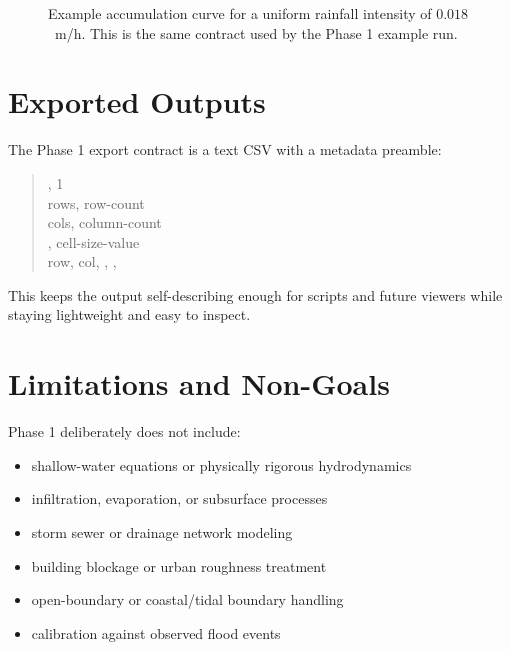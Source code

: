\documentclass[10pt]{article}
\begin{document}
\begin{figure}[h]
\centering
{}
\caption{Example accumulation curve for a uniform rainfall intensity of $0.018$~m/h. This is the same contract used by the Phase 1 example run.}
\end{figure}

\section{Exported Outputs}

The Phase 1 export contract is a text CSV with a metadata preamble:

\begin{quote}
\small
{}, 1 \\
rows, row-count \\
cols, column-count \\
{}, cell-size-value \\
row, col, {}, {}, {}
\end{quote}

This keeps the output self-describing enough for scripts and future viewers while staying lightweight and easy to inspect.

\section{Limitations and Non-Goals}

Phase 1 deliberately does not include:

\begin{itemize}
    \item shallow-water equations or physically rigorous hydrodynamics
    \item infiltration, evaporation, or subsurface processes
    \item storm sewer or drainage network modeling
    \item building blockage or urban roughness treatment
    \item open-boundary or coastal/tidal boundary handling
    \item calibration against observed flood events
\end{itemize}
\end{document}
